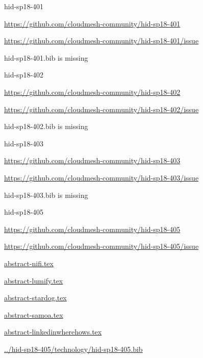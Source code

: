 \begin{IU}

hid-sp18-401

\url{https://github.com/cloudmesh-community/hid-sp18-401}

\url{https://github.com/cloudmesh-community/hid-sp18-401/issue}

hid-sp18-401.bib is missing

\end{IU}


\begin{IU}

hid-sp18-402

\url{https://github.com/cloudmesh-community/hid-sp18-402}

\url{https://github.com/cloudmesh-community/hid-sp18-402/issue}

hid-sp18-402.bib is missing

\end{IU}


\begin{IU}

hid-sp18-403

\url{https://github.com/cloudmesh-community/hid-sp18-403}

\url{https://github.com/cloudmesh-community/hid-sp18-403/issue}

hid-sp18-403.bib is missing

\end{IU}


\begin{IU}

hid-sp18-405

\url{https://github.com/cloudmesh-community/hid-sp18-405}

\url{https://github.com/cloudmesh-community/hid-sp18-405/issue}

\href{https://github.com/cloudmesh-community/hid-sp18-405/blob/master//technology/abstract-nifi.tex}{abstract-nifi.tex}

\href{https://github.com/cloudmesh-community/hid-sp18-405/blob/master//technology/abstract-lumify.tex}{abstract-lumify.tex}

\href{https://github.com/cloudmesh-community/hid-sp18-405/blob/master//technology/abstract-stardog.tex}{abstract-stardog.tex}

\href{https://github.com/cloudmesh-community/hid-sp18-405/blob/master//technology/abstract-samoa.tex}{abstract-samoa.tex}

\href{https://github.com/cloudmesh-community/hid-sp18-405/blob/master//technology/abstract-linkedinwherehows.tex}{abstract-linkedinwherehows.tex}

\href{https://github.com/cloudmesh-community/hid-sp18-405/blob/master//technology/hid-sp18-405.bib}{../hid-sp18-405/technology/hid-sp18-405.bib}

\end{IU}


